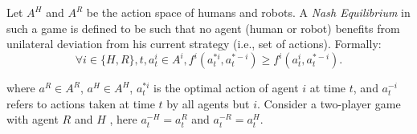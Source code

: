 \documentclass[letterpaper, 10 pt, conference]{ieeeconf}  %
\begin{document}
Let $A^H$ and $ A^R$ be the action space of humans and robots. A \textit{Nash Equilibrium} in such a game is defined to be such that 
no agent (human or robot) benefits from unilateral deviation from his current 
strategy (i.e., set of actions). Formally:
\begin{equation}
	\forall i \in \{H,R\}, t,a^{i}_t \in A^i, f^i(a^{*i}_t,a^{*-i}_t) \geq f^i(a^{i}_t,a^{*-i}_t). 
\end{equation}

where $a^R \in A^R$,  $a^H \in A^H$, $a^{*i}_t$ is the optimal action of agent $i$ at time $t$, and $a^{-i}_t$ refers to actions taken at time $t$ by all agents but $i$.
Consider a two-player game with agent $R$ and $H$ , here $a_t^{-H} = a_t^R$ and $a_t^{-R} = a_t^H$. 

 

\end{document}
